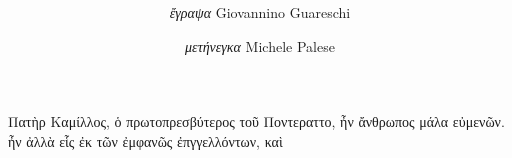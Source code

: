 \documentclass[a4paper, 12pt]{article}
\title{
	\Huge{\MyTitle}
}
\author{
	\textit{ἔγραψα} Giovannino Guareschi
	\and
	\textit{μετήνεγκα} Michele Palese
}
\date{}
\begin{document}
	\maketitle

	\begin{otherlanguage}{polytonicgreek}
		Πατὴρ Καμίλλος, ὁ πρωτοπρεσβύτερος τοῦ Ποντεραττο, ἦν ἄνθρωπος μάλα εὐμενῶν.
		ἦν ἀλλὰ εἷς ἐκ τῶν ἐμφανῶς ἐπγγελλόντων, καὶ
	\end{otherlanguage}
\end{document}
